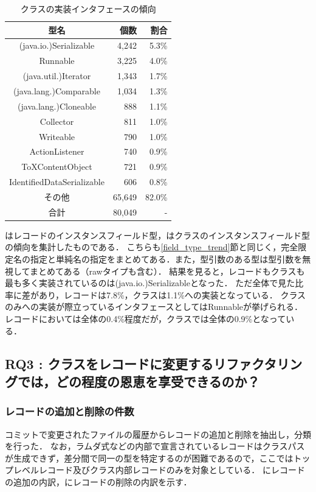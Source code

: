 \begin{table}[t]
    \caption{クラスの実装インタフェースの傾向}
    \label{class_interface_types}
    \centering
    \begin{tabular}{c||r|r}
        \hline
        型名 & 個数 & 割合\\
        \hline\hline
        (java.io.)Serializable & 4,242 & 5.3\%\\
        Runnable & 3,225 & 4.0\%\\
        (java.util.)Iterator & 1,343 & 1.7\%\\
        (java.lang.)Comparable & 1,034 & 1.3\%\\
        (java.lang.)Cloneable & 888 & 1.1\%\\
        Collector & 811 & 1.0\%\\
        Writeable & 790 & 1.0\%\\
        ActionListener & 740 & 0.9\%\\
        ToXContentObject & 721 & 0.9\%\\
        IdentifiedDataSerializable & 606 & 0.8\%\\
        その他 & 65,649 & 82.0\%\\
        \hline
        合計 & 80,049 & -\\
        \hline
    \end{tabular}
\end{table}

はレコードのインスタンスフィールド型，はクラスのインスタンスフィールド型の傾向を集計したものである．
こちらも\ref{field_type_trend}節と同じく，完全限定名の指定と単純名の指定をまとめてある．また，型引数のある型は型引数を無視してまとめてある（rawタイプも含む）．
結果を見ると，レコードもクラスも最も多く実装されているのは(java.io.)Serializableとなった．
ただ全体で見た比率に差があり，レコードは7.8\%，クラスは1.1\%への実装となっている．
クラスのみへの実装が際立っているインタフェースとしてはRunnableが挙げられる．
レコードにおいては全体の0.4\%程度だが，クラスでは全体の0.9\%となっている．

\subsection{RQ3 : クラスをレコードに変更するリファクタリングでは，どの程度の恩恵を享受できるのか？\label{rq3_result}}

\subsubsection{レコードの追加と削除の件数}
コミットで変更されたファイルの履歴からレコードの追加と削除を抽出し，分類を行った．
なお，ラムダ式などの内部で宣言されているレコードはクラスパスが生成できず，差分間で同一の型を特定するのが困難であるので，ここではトップレベルレコード及びクラス内部レコードのみを対象としている．
にレコードの追加の内訳，にレコードの削除の内訳を示す．

